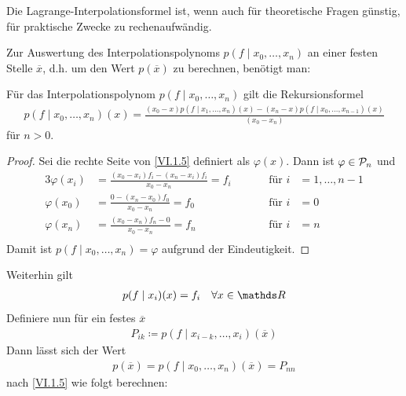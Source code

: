 Die Lagrange-Interpolationsformel ist,
wenn auch für theoretische Fragen günstig,
für praktische Zwecke zu rechenaufwändig.

Zur Auswertung des Interpolationspolynoms $p(f\mid x_0,\dots, x_n)$
an einer festen Stelle $\overline{x}$, d.h.
um den Wert $p(\overline{x} ) $ zu berechnen,
benötigt man:

\begin{Leme}
  Für das Interpolationspolynom $p(f\mid x_0, \dots, x_n)$ gilt die 
  Rekursionsformel
  \begin{gather}
    p(f\mid x_0, \dots, x_n) (x) = \frac{(x_0-x)p(f\mid x_1,\dots, x_n)(x) -
      (x_n-x)p(f\mid x_0,\dots, x_{n-1})(x)}
    {(x_0-x_n)}
    \label{VI.1.5}
  \end{gather}
  für $n>0$.	
\end{Leme}

\begin{proof}
  Sei die rechte Seite von \eqref{VI.1.5} definiert als $\varphi(x)$.
  Dann ist $\varphi\in\mathcal{P}_n$ und 
  \begin{alignat*}{3}
    \varphi(x_i) &= \frac{(x_0-x_i)f_i-(x_n-x_i)f_i}{x_0-x_n}= f_i\quad
    &&&\text{für } i&=1,\dots , n-1\\
    \varphi(x_0) &= \frac{0-(x_n-x_0)f_0}{x_0-x_n} = f_0
    &&&\text{für } i&=0\\
    \varphi(x_n) &= \frac{(x_0-x_n)f_n-0}{x_0-x_n} = f_n
    &&&\text{für } i&=n\\
  \end{alignat*}
  Damit ist $p(f\mid x_0, \dots, x_n) = \varphi$ aufgrund der Eindeutigkeit.
\end{proof}



Weiterhin gilt
\begin{gather}
  p(f\mid  x_i)(x) = f_i\quad \forall x\in\R
  \label{VI.1.6}
\end{gather}
Definiere nun für ein festes $\overline{x}$
\begin{gather}
  P_{ik} \coloneqq p(f\mid  x_{i-k}, \dots, x_{i})(\overline{x})
  \label{VI.1.7}
\end{gather}
Dann lässt sich der Wert
\begin{gather*}
  p(\overline{x}) = p(f\mid  x_0, \dots , x_n)(\overline{x})= P_{nn}
\end{gather*}
nach \eqref{VI.1.5} wie folgt berechnen:



